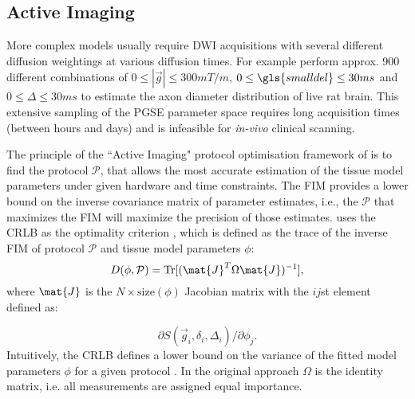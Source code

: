 \subsection{Active Imaging}
\label{sec:protocol_optimisation}
More complex models usually require  {\gls{DWI}}  acquisitions with several different diffusion weightings at various diffusion times. For example \citet{Barazany:2009} perform approx. 900 different combinations of $0\le|\vec{g}|\le 300mT/m$, $0\le {\gls{smalldel}} \le 30ms$ and $0\le \Delta \le 30ms$ to estimate the axon diameter distribution of live rat brain. This extensive sampling of the \gls{PGSE} parameter space requires long acquisition times (between hours and days) and is infeasible for \emph{in-vivo} clinical scanning. 

The principle of the ``Active Imaging" protocol optimisation framework of \cite{Alexander:2008} is to find the protocol $\mathcal{P}$, that allows the most accurate estimation of the tissue model parameters under given hardware and time constraints. The \gls{FIM} provides a lower bound on the inverse covariance matrix of parameter estimates, i.e., the $\mathcal{P}$ that maximizes the \gls{FIM} will maximize the precision of those estimates. \citeauthor{Alexander:2008} uses the \gls{CRLB} as the optimality criterion \citep{OBrien:2003}, which is defined as the trace of the inverse \gls{FIM} of protocol $\mathcal{P}$ and tissue model parameters $\phi$:
\begin{equation}
	D(\phi,\mathcal{P})=\mbox{Tr}[(\mat{J}^T\Omega\mat{J})^{-1}], 
	\label{eq-optimality}
\end{equation}
where $\mat{J}$ is the $N\times \mbox{size}(\phi)$ Jacobian matrix with the $ij$st element defined as:

\begin{equation}
	\partial S(\vec{g}_i,\delta_i,\Delta_i) / \partial \phi_j.
\end{equation}
Intuitively, the \gls{CRLB} defines a lower bound on the variance of the fitted model parameters $\phi$ for a given protocol \prot. In the original approach $\Omega$ is the identity matrix, i.e. all measurements are assigned equal importance. 


